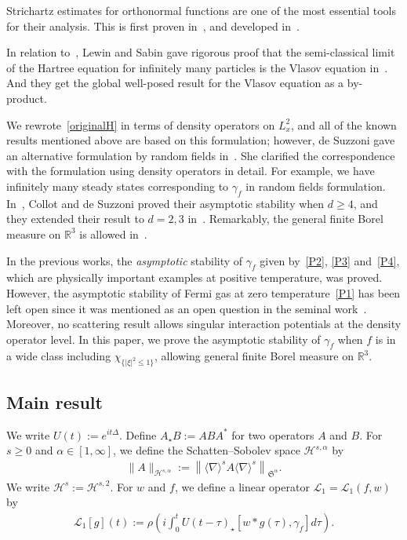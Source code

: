 \documentclass[10pt,a4paper]{amsart}
\newcommand{\BR}{\mathbb{R}}
\newcommand{\CH}{\mathcal{H}}
\newcommand{\CL}{\mathcal{L}}
\newcommand{\FS}{\mathfrak{S}}
\newcommand{\al}{\alpha}
\newcommand{\ga}{\gamma}
\newcommand{\ta}{\tau}
\newcommand{\rh}{\rho}
\newcommand{\ch}{\chi}
\newcommand{\De}{\Delta}
\newcommand{\K}[1]{\left(#1\right)}
\newcommand{\I}{\infty}
\newcommand{\sd}{\langle \nabla \rangle}
\newcommand{\Sa}{{\FS^\al}}
\newcommand{\st}{\star}
\newcommand{\R}{\mathbb{R}}
\begin{document}
Strichartz estimates for orthonormal functions are one of the most essential tools for their analysis. This is first proven in~\cite{2014FLLS}, and developed in~\cite{2019BHLNS,2017FS}.

In relation to~\cite{2014LS,2015LS}, Lewin and Sabin gave rigorous proof that the semi-classical limit of the Hartree equation for infinitely many particles is the Vlasov equation in~\cite{2020LS}. And they get the global well-posed result for the Vlasov equation as a by-product.

We rewrote~\eqref{originalH} in terms of density operators on $L^2_x$, and all of the known results mentioned above are based on this formulation; however, de Suzzoni gave an alternative formulation by random fields in~\cite{2015S}. She clarified the correspondence with the formulation using density operators in detail. For example, we have infinitely many steady states corresponding to $\ga_f$ in random fields formulation. In~\cite{2020CS}, Collot and de Suzzoni proved their asymptotic stability when $d\geq 4$, and they extended their result to $d=2,3$ in~\cite{2022CS}. Remarkably, the general finite Borel measure on $\R^3$ is allowed in~\cite{2022CS}.


In the previous works, the \emph{asymptotic} stability of $\ga_f$ given by~\eqref{P2}, \eqref{P3} and~\eqref{P4}, which are physically important examples at positive temperature, was proved. However, the asymptotic stability of Fermi gas at zero temperature~\eqref{P1} has been left open since it was mentioned as an open question in the seminal work~\cite{2014LS}. Moreover, no scattering result allows singular interaction potentials at the density operator level. In this paper, we prove the asymptotic stability of $\ga_f$ when $f$ is in a wide class including $\ch_{\{|\xi|^2\le 1\}}$, allowing general finite Borel measure on $\BR^3$.

\subsection{Main result}

We write $U(t):=e^{it\De}$. Define $A_\st B := A B A^*$ for two operators $A$ and $B$. For $s \ge 0$ and $\al \in [1,\I]$, we define the Schatten--Sobolev space $\CH^{s,\al}$ by
\begin{align}
\|A\|_{\CH^{s,\al}} := \left\|\sd^s A \sd^s\right\|_\Sa.
\end{align}
We write $\CH^{s}:= \CH^{s,2}$. For $w$ and $f$, we define a linear operator $\CL_1 = \CL_1(f,w)$ by
\begin{align}
\CL_1[g](t) := \rh \K{i\int_0^t U(t-\ta)_\st [w \ast g(\ta), \ga_f] d\ta}.
\end{align}
\end{document}
